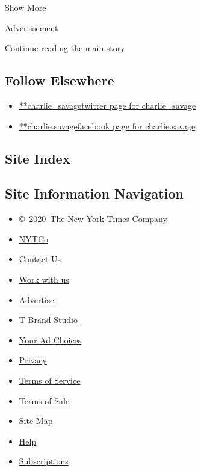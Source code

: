 Show More

Advertisement

\protect\hyperlink{after-mid2}{Continue reading the main story}

\hypertarget{follow-elsewhere}{%
\subsection{Follow Elsewhere}\label{follow-elsewhere}}

\begin{itemize}
\tightlist
\item
  \href{https://twitter.com/charlie_savage}{**charlie\_savagetwitter
  page for charlie\_savage}
\item
  \href{https://www.facebook.com/charlie.savage}{**charlie.savagefacebook
  page for charlie.savage}
\end{itemize}

\hypertarget{site-index}{%
\subsection{Site Index}\label{site-index}}

\hypertarget{site-information-navigation}{%
\subsection{Site Information
Navigation}\label{site-information-navigation}}

\begin{itemize}
\tightlist
\item
  \href{https://help.nytimes.com/hc/en-us/articles/115014792127-Copyright-notice}{©~2020~The
  New York Times Company}
\end{itemize}

\begin{itemize}
\tightlist
\item
  \href{https://www.nytco.com/}{NYTCo}
\item
  \href{https://help.nytimes.com/hc/en-us/articles/115015385887-Contact-Us}{Contact
  Us}
\item
  \href{https://www.nytco.com/careers/}{Work with us}
\item
  \href{https://nytmediakit.com/}{Advertise}
\item
  \href{http://www.tbrandstudio.com/}{T Brand Studio}
\item
  \href{https://www.nytimes.com/privacy/cookie-policy\#how-do-i-manage-trackers}{Your
  Ad Choices}
\item
  \href{https://www.nytimes.com/privacy}{Privacy}
\item
  \href{https://help.nytimes.com/hc/en-us/articles/115014893428-Terms-of-service}{Terms
  of Service}
\item
  \href{https://help.nytimes.com/hc/en-us/articles/115014893968-Terms-of-sale}{Terms
  of Sale}
\item
  \href{https://spiderbites.nytimes.com}{Site Map}
\item
  \href{https://help.nytimes.com/hc/en-us}{Help}
\item
  \href{https://www.nytimes.com/subscription?campaignId=37WXW}{Subscriptions}
\end{itemize}

